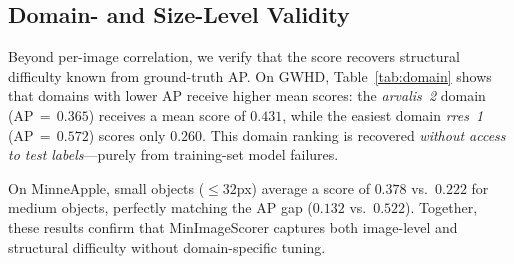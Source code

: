 \documentclass[conference]{IEEEtran}
\begin{document}
\begin{table}[t]
\centering
\caption{Pearson correlation of $S_{\mathrm{img}}$ with per-image
miss rate and FP rate (training set, w/ traditional augmentation).}
\label{tab:corr}
\end{table}

\subsection{Domain- and Size-Level Validity}

Beyond per-image correlation, we verify that the score recovers
structural difficulty known from ground-truth AP. On GWHD,
Table~\ref{tab:domain} shows that domains with lower AP receive
higher mean scores: the \textit{arvalis~2} domain (AP\,$=\,0.365$)
receives a mean score of $0.431$, while the easiest domain
\textit{rres~1} (AP\,$=\,0.572$) scores only $0.260$.
This domain ranking is recovered \textit{without access to test
labels}---purely from training-set model failures.

On MinneApple, small objects (${\le}32$px) average a score of
$0.378$ vs.\ $0.222$ for medium objects, perfectly matching the
AP gap ($0.132$ vs.\ $0.522$). Together, these results confirm
that MinImageScorer captures both image-level and structural
difficulty without domain-specific tuning.

\begin{table}[t]
\centering
\caption{GWHD domain AP vs.\ mean $S_{\mathrm{img}}$. Domains with
  lower AP consistently receive higher scores (no test labels used).}
\label{tab:domain}
\end{table}
\end{document}

